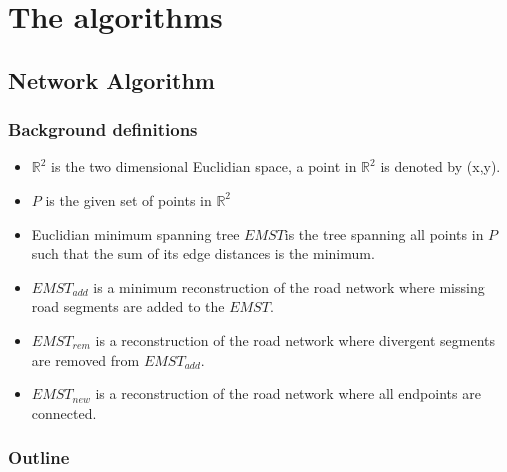 \documentclass[11pt, twocolumn]{article}
\begin{document}
\section{The algorithms}
\label{se:algorithms}
\subsection{Network Algorithm}
\subsubsection{Background definitions}
\begin{itemize}
  \item $\mathbb{R}^2$ is the two dimensional Euclidian space, a point in $\mathbb{R}^2$ is denoted by (x,y).
  \item $P$ is the given set of points in $\mathbb{R}^2$
  \item Euclidian minimum spanning tree $EMST$is the tree spanning all points in $P$ such that the sum of its edge distances is the minimum.
  \item $EMST_{add}$ is a minimum reconstruction of the road network where missing road segments are added to the $EMST$.
  \item $EMST_{rem}$ is a reconstruction of the road network where divergent segments are removed from $EMST_{add}$.
  \item $EMST_{new}$ is a reconstruction of the road network where all endpoints are connected.
\end{itemize}
\subsubsection{Outline}
\end{document}
